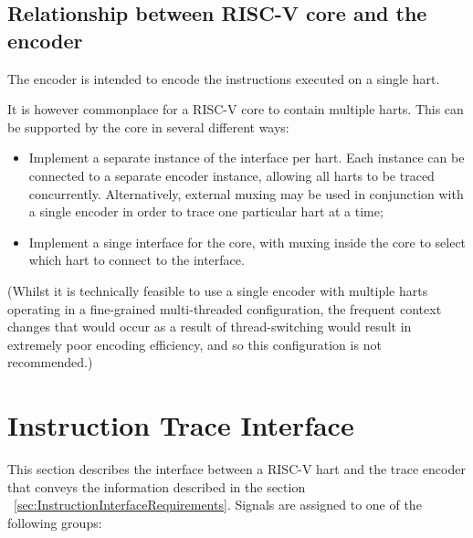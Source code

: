 \subsection{Relationship between RISC-V core and the encoder} \label{sec:relationship}

The encoder is intended to encode the instructions executed on a single hart.  

It is however commonplace for a RISC-V core to contain multiple harts.  This can be 
supported by the core in several different ways:

\begin{itemize}
  \item Implement a separate instance of the interface per hart.  Each instance can be connected
    to a separate encoder instance, allowing all harts to be traced concurrently.  Alternatively,
    external muxing may be used in conjunction with a single encoder in order to trace one particular 
    hart at a time;
  \item Implement a singe interface for the core, with muxing inside the core to select which hart to 
  connect to the interface.
\end{itemize}

(Whilst it is technically feasible to use a single encoder with multiple harts operating 
in a fine-grained multi-threaded configuration, the frequent context changes that would occur
as a result of thread-switching would result in extremely poor encoding efficiency, and so
this configuration is not recommended.)

\section{Instruction Trace Interface}\label{sec:InstructionTraceInterface}
This section describes the interface between a RISC-V hart and the
trace encoder that conveys the information described in the section ~\ref{sec:InstructionInterfaceRequirements}.  
Signals are assigned to one of the  following groups:


